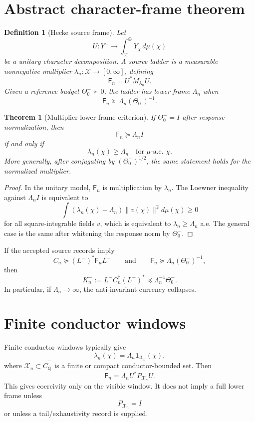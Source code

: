 \documentclass[11pt]{article}
\newtheorem{theorem}{Theorem}
\newtheorem{definition}{Definition}
\newcommand{\F}{\mathsf F}
\newcommand{\X}{\mathcal X}
\begin{document}
\section{Abstract character-frame theorem}
\begin{definition}[Hecke source frame]
Let
\[
U:Y^-\to \int_{\X}^{\oplus}Y_\chi\,d\mu(\chi)
\]
be a unitary character decomposition.  A source ladder is a measurable nonnegative multiplier \(\lambda_n:\X\to[0,\infty]\), defining
\[
\F_n=U^*M_{\lambda_n}U.
\]
Given a reference budget \(\Theta_0^-\succ0\), the ladder has lower frame \(\Lambda_n\) when
\[
\F_n\succeq \Lambda_n(\Theta_0^-)^{-1}.
\]
\end{definition}

\begin{theorem}[Multiplier lower-frame criterion]
If \(\Theta_0^-=I\) after response normalization, then
\[
\F_n\succeq \Lambda_n I
\]
if and only if
\[
\lambda_n(\chi)\ge \Lambda_n
\quad\text{for }\mu\text{-a.e. }\chi.
\]
More generally, after conjugating by \((\Theta_0^-)^{1/2}\), the same statement holds for the normalized multiplier.
\end{theorem}

\begin{proof}
In the unitary model, \(\F_n\) is multiplication by \(\lambda_n\).  The Loewner inequality against \(\Lambda_n I\) is equivalent to
\[
\int (\lambda_n(\chi)-\Lambda_n)\|v(\chi)\|^2d\mu(\chi)\ge0
\]
for all square-integrable fields \(v\), which is equivalent to \(\lambda_n\ge\Lambda_n\) a.e.  The general case is the same after whitening the response norm by \(\Theta_0^-\).
\end{proof}

\begin{corollary}
If the accepted source records imply
\[
C_n\succeq (L^-)^*\F_nL^-
\qquad\text{and}\qquad
\F_n\succeq\Lambda_n(\Theta_0^-)^{-1},
\]
then
\[
K_n^-:=L^-C_n^\dagger(L^-)^*
\preceq
\Lambda_n^{-1}\Theta_0^-.
\]
In particular, if \(\Lambda_n\to\infty\), the anti-invariant currency collapses.
\end{corollary}

\section{Finite conductor windows}
Finite conductor windows typically give
\[
\lambda_n(\chi)=\Lambda_n\mathbf 1_{\X_n}(\chi),
\]
where \(\X_n\subset\widehat C_\mathbb Q^-
\) is a finite or compact conductor-bounded set.  Then
\[
\F_n=\Lambda_n U^*P_{\X_n}U.
\]
This gives coercivity only on the visible window.  It does not imply a full lower frame unless
\[
P_{\X_n}=I
\]
or unless a tail/exhaustivity record is supplied.
\end{document}
